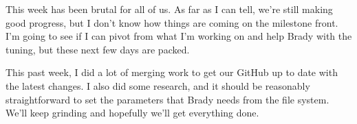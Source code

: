 \documentclass[12pt, titlepage]{article}
\begin{document}
This week has been brutal for all of us. As far as I can tell, we're still making good progress, but I don't know how things are coming on the milestone front. I'm going to see if I can pivot from what I'm working on and help Brady with the tuning, but these next few days are packed. 

This past week, I did a lot of merging work to get our GitHub up to date with the latest changes. I also did some research, and it should be reasonably straightforward to set the parameters that Brady needs from the file system. We'll keep grinding and hopefully we'll get everything done.
\end{document}
